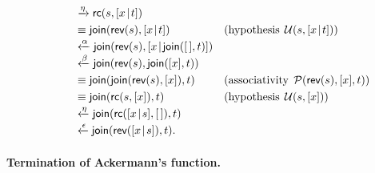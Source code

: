 \begin{align*}
\hphantom{XXXX}
  &\smashedrightarrow{\eta} \fun{rc}(s,\cons{x}{t})\\
  &\equiv \fun{join}(\fun{rev}(s),\cons{x}{t})
  && (\text{hypothesis}\;\, \mathcal{U}(s,\cons{x}{t}))\\
  &\smashedleftarrow{\alpha}
   \fun{join}(\fun{rev}(s),\cons{x}{\fun{join}(\el,t)})\\
  &\smashedleftarrow{\beta} \fun{join}(\fun{rev}(s),\fun{join}([x],t))\\
  &\equiv \fun{join}(\fun{join}(\fun{rev}(s),[x]),t)
  && (\text{associativity} \;\, \mathcal{P}(\fun{rev}(s),[x],t))\\
  &\equiv \fun{join}(\fun{rc}(s,[x]),t)
  && (\text{hypothesis}\;\, \mathcal{U}(s,[x]))\\
  &\smashedleftarrow{\eta} \fun{join}(\fun{rc}(\cons{x}{s},\el),t)\\
  &\smashedleftarrow{\epsilon} \fun{join}(\fun{rev}(\cons{x}{s}),t).
\end{align*}

\medskip

\paragraph{Termination of Ackermann's function.}


